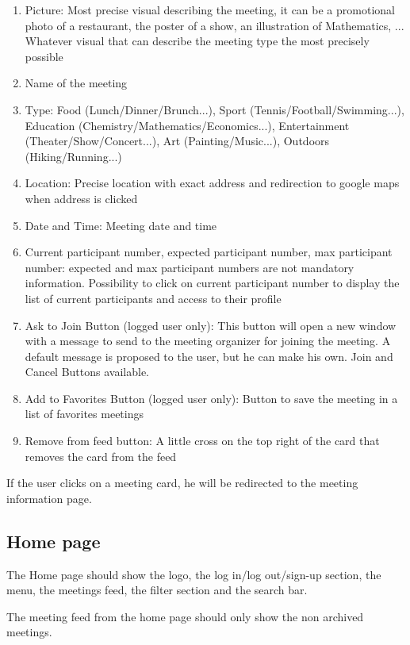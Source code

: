 \documentclass[conference]{IEEEtran}
\begin{document}
\begin{enumerate}
    \item Picture: Most precise visual describing the meeting, it can be a promotional photo of a restaurant, the poster of a show, an illustration of Mathematics, ... Whatever visual that can describe the meeting type the most precisely possible
    \item Name of the meeting
    \item Type: Food (Lunch/Dinner/Brunch...), Sport (Tennis/Football/Swimming...), Education (Chemistry/Mathematics/Economics...), Entertainment (Theater/Show/Concert...), Art (Painting/Music...), Outdoors (Hiking/Running...)
    \item Location: Precise location with exact address and redirection to google maps when address is clicked
    \item Date and Time: Meeting date and time
    \item Current participant number, expected participant number, max participant number: expected and max participant numbers are not mandatory information. 
    Possibility to click on current participant number to display the list of current participants and access to their profile
    \item Ask to Join Button (logged user only): This button will open a new window with a message to send to the meeting organizer for joining the meeting. 
    A default message is proposed to the user, but he can make his own. 
    Join and Cancel Buttons available.
    \item Add to Favorites Button (logged user only): Button to save the meeting in a list of favorites meetings
    \item Remove from feed button: A little cross on the top right of the card that removes the card from the feed
\end{enumerate}

If the user clicks on a meeting card, he will be redirected to the meeting information page.

\subsection{Home page}

The Home page should show the logo, the log in/log out/sign-up section, the menu, the meetings feed, the filter section and the search bar.

The meeting feed from the home page should only show the non archived meetings.
\end{document}
